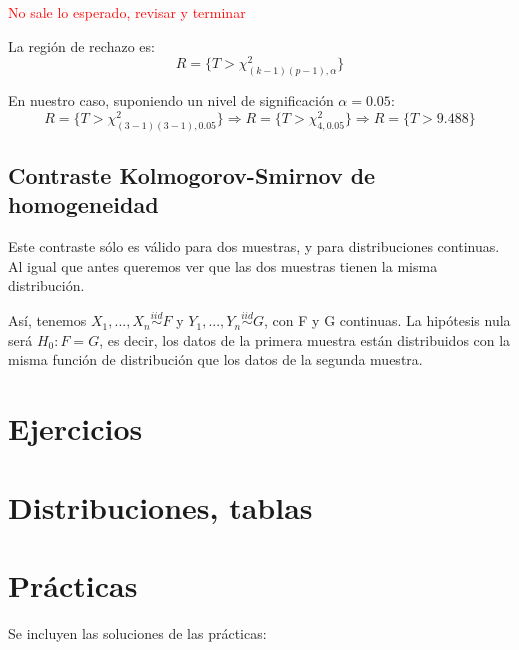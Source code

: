 \documentclass[nochap]{apuntes}
\begin{document}
\begin{example}
\textcolor{red}{No sale lo esperado, revisar y terminar}

La región de rechazo es:
$$ R=\{T > \chi^2_{(k-1)(p-1),\alpha}\}$$

En nuestro caso, suponiendo un nivel de significación $\alpha=0.05$:
$$ R=\{T > \chi^2_{(3-1)(3-1),0.05}\} \Rightarrow R=\{T > \chi^2_{4,0.05}\} \Rightarrow  R=\{T > 9.488\}$$
\end{example}

\section{Contraste Kolmogorov-Smirnov de homogeneidad}
Este contraste sólo es válido para dos muestras, y para distribuciones continuas. Al igual que antes queremos ver que las dos muestras tienen la misma distribución.

Así, tenemos $X_1,...,X_n \stackrel{iid}{\sim} F$ y $Y_1,...,Y_n \stackrel{iid}{\sim} G$, con F y G continuas. La hipótesis nula será $H_0: F=G$, es decir, los datos de la primera muestra están distribuidos con la misma función de distribución que los datos de la segunda muestra.

\appendix
\chapter{Ejercicios}


\chapter{Distribuciones, tablas}



\chapter{Prácticas}
Se incluyen las soluciones de las prácticas:

\end{document}
